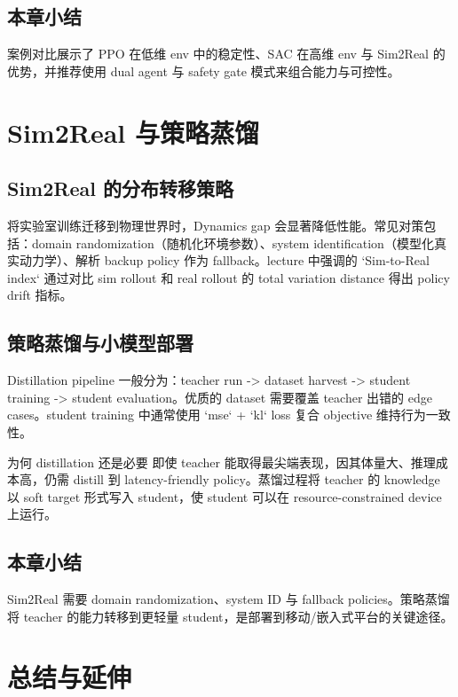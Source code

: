 \documentclass[a4paper]{article}
\begin{document}
\subsection{本章小结}

案例对比展示了 PPO 在低维 env 中的稳定性、SAC 在高维 env 与 Sim2Real 的优势，并推荐使用 dual agent 与 safety gate 模式来组合能力与可控性。

\section{Sim2Real 与策略蒸馏}

\subsection{Sim2Real 的分布转移策略}

将实验室训练迁移到物理世界时，Dynamics gap 会显著降低性能。常见对策包括：domain randomization（随机化环境参数）、system identification（模型化真实动力学）、解析 backup policy 作为 fallback。lecture 中强调的 `Sim-to-Real index` 通过对比 sim rollout 和 real rollout 的 total variation distance 得出 policy drift 指标。

\subsection{策略蒸馏与小模型部署}

Distillation pipeline 一般分为：teacher run -> dataset harvest -> student training -> student evaluation。优质的 dataset 需要覆盖 teacher 出错的 edge cases。student training 中通常使用 `mse` + `kl` loss 复合 objective 维持行为一致性。

\begin{knowledgebox}{为何 distillation 还是必要}
即使 teacher 能取得最尖端表现，因其体量大、推理成本高，仍需 distill 到 latency-friendly policy。蒸馏过程将 teacher 的 knowledge 以 soft target 形式写入 student，使 student 可以在 resource-constrained device 上运行。
\end{knowledgebox}

\subsection{本章小结}

Sim2Real 需要 domain randomization、system ID 与 fallback policies。策略蒸馏将 teacher 的能力转移到更轻量 student，是部署到移动/嵌入式平台的关键途径。


\section{总结与延伸}
\end{document}
